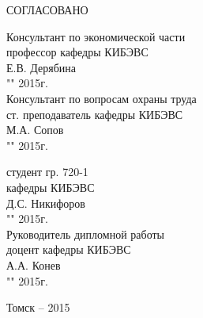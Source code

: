 \begin{singlespace}
 \begin{minipage}[left]{0.45\linewidth}
 СОГЛАСОВАНО
 
 Консультант по экономической части\\
 профессор кафедры КИБЭВС \\
 \underline{\hspace{2.5cm}}Е.В. Дерябина \\
 "\underline{\hspace{1cm}}"\underline{\hspace{3cm}} 2015г.\\

 Консультант по вопросам охраны труда\\
 ст. преподаватель кафедры КИБЭВС \\
 \underline{\hspace{2.5cm}}М.А. Сопов \\
 "\underline{\hspace{1cm}}"\underline{\hspace{3cm}} 2015г.\\
 \end{minipage}
 \hfill
 \begin{minipage}[left]{0.4\linewidth}
 студент гр. 720-1 \\
 кафедры КИБЭВС \\
 \underline{\hspace{2.5cm}}Д.С. Никифоров \\
 "\underline{\hspace{1cm}}"\underline{\hspace{3cm}} 2015г.\\
 
 Руководитель дипломной работы \\
 доцент кафедры КИБЭВС \\
 \underline{\hspace{2.5cm}}А.А. Конев \\
 "\underline{\hspace{1cm}}"\underline{\hspace{3cm}} 2015г.\\
 \end{minipage}
\end{singlespace}

\vfill
\begin{center}
Томск -- 2015
\end{center}